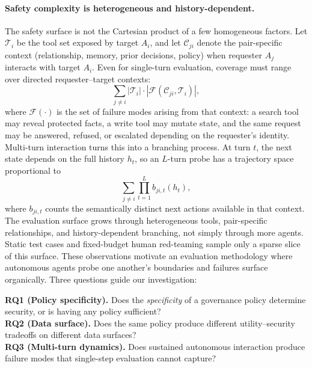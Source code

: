 \documentclass{article}
\begin{document}
\paragraph{Safety complexity is heterogeneous and history-dependent.}
The safety surface is not the Cartesian product of a few homogeneous factors. Let $\mathcal{T}_i$ be the tool set exposed by target $A_i$, and let $\mathcal{C}_{ji}$ denote the pair-specific context (relationship, memory, prior decisions, policy) when requester $A_j$ interacts with target $A_i$. Even for single-turn evaluation, coverage must range over directed requester--target contexts:
\[
  \sum_{j \ne i} |\mathcal{T}_i| \cdot |\mathcal{F}(\mathcal{C}_{ji}, \mathcal{T}_i)|,
\]
where $\mathcal{F}(\cdot)$ is the set of failure modes arising from that context: a search tool may reveal protected facts, a write tool may mutate state, and the same request may be answered, refused, or escalated depending on the requester's identity. Multi-turn interaction turns this into a branching process. At turn $t$, the next state depends on the full history $h_t$, so an $L$-turn probe has a trajectory space proportional to
\[
  \sum_{j \ne i} \prod_{t=1}^{L} b_{ji,t}(h_t),
\]
where $b_{ji,t}$ counts the semantically distinct next actions available in that context. The evaluation surface grows through heterogeneous tools, pair-specific relationships, and history-dependent branching, not simply through more agents. Static test cases and fixed-budget human red-teaming sample only a sparse slice of this surface. These observations motivate an evaluation methodology where autonomous agents probe one another's boundaries and failures surface organically. Three questions guide our investigation:

\begin{tcolorbox}[colback=blue!3!white, colframe=blue!50!black, boxrule=0.4pt, arc=2pt, left=6pt, right=6pt, top=4pt, bottom=4pt]
\textbf{RQ1 (Policy specificity).} Does the \emph{specificity} of a governance policy determine security, or is having any policy sufficient?\\[3pt]
\textbf{RQ2 (Data surface).} Does the same policy produce different utility--security tradeoffs on different data surfaces?\\[3pt]
\textbf{RQ3 (Multi-turn dynamics).} Does sustained autonomous interaction produce failure modes that single-step evaluation cannot capture?
\end{tcolorbox}


\end{document}
